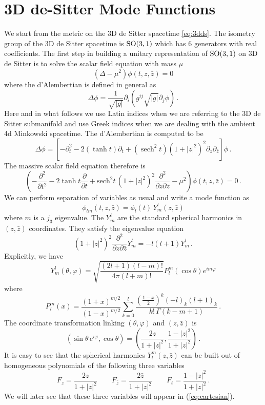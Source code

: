 \documentclass{brownthesis}
\DeclareMathOperator{\sech}{sech}
\begin{document}
\section{3D de-Sitter Mode Functions}

\label{sec:dsmodes}

We start from the metric on the 3D de Sitter spacetime \eqref{eq:3dds}.
The isometry group of the 3D de Sitter spacetime is ${\rm SO(3,1)}$
which has 6 generators with real coefficients. The first step in building
a unitary representation of ${\rm SO(3,1)}$ on 3D de Sitter is to
solve the scalar field equation with mass $\mu$
\[
(\Delta-\mu^{2})\phi(t,z,\bar{z})=0
\]
where the d'Alembertian is defined in general as
\[
\Delta\phi=\frac{1}{\sqrt{|g|}}\partial_{i}(g^{ij}\sqrt{|g|}\partial_{j}\phi)\,.
\]
Here and in what follows we use Latin indices when we are referring
to the 3D de Sitter submanifold and use Greek indices when we are
dealing with the ambient 4d Minkowski spacetime. The d'Alembertian
is computed to be
\[
\Delta\phi=\left[-\partial_{t}^{2}-2(\tanh t)\partial_{t}+(\sech^{2}t)(1+|z|^{2})^{2}\partial_{z}\partial_{\bar{z}}\right]\phi\,.
\]
The massive scalar field equation therefore is
\[
\left(-\frac{\partial^{2}}{\partial t^{2}}-2\tanh t\frac{\partial}{\partial t}+\mathrm{sech}^{2}t\,(1+|z|^{2})^{2}\frac{\partial^{2}}{\partial z\partial\bar{z}}-\mu^{2}\right)\phi(t,z,\bar{z})=0\,.
\]
We can perform separation of variables as usual and write a mode function
as
\[
\phi_{lm}(t,z,\bar{z})=\phi_{l}(t)\,Y_{m}^{l}(z,\bar{z})
\]
where $m$ is a $j_{3}$ eigenvalue. The $Y_{m}^{l}$ are the standard
spherical harmonics \cite{kelvin1867treatise} in $(z,\bar{z})$
coordinates. They satisfy the eigenvalue equation
\[
(1+|z|^{2})^{2}\frac{\partial^{2}}{\partial z\partial\bar{z}}Y_{m}^{l}=-l(l+1)Y_{m}^{l}\,.
\]
Explicitly, we have
\[
Y_{m}^{l}(\theta,\varphi)=\sqrt{\frac{(2l+1)(l-m)!}{4\pi(l+m)!}}P_{l}^{m}(\cos\theta)e^{im\varphi}
\]
where
\[
P_{l}^{m}(x)=\frac{(1+x)^{m/2}}{(1-x)^{m/2}}\sum_{k=0}^{l}\frac{\left(\frac{1-x}{2}\right)^{k}(-l)_{k}(l+1)_{k}}{k!\,\Gamma(k-m+1)}\,.
\]
The coordinate transformation linking $(\theta,\varphi)$ and $(z,\bar{z})$
is
\[
(\sin\theta\,e^{i\varphi},\cos\theta)=\left(\frac{2z}{1+|z|^{2}},\frac{1-|z|^{2}}{1+|z|^{2}}\right)\,.
\]
It is easy to see that the spherical harmonics $Y_{l}^{m}(z,\bar{z})$
can be built out of homogeneous polynomials of the following three
variables
\[
F_{z}=\frac{2z}{1+|z|^{2}}\qquad F_{\bar{z}}=\frac{2\bar{z}}{1+|z|^{2}}\qquad F_{t}=\frac{1-|z|^{2}}{1+|z|^{2}}\,.
\]
We will later see that these three variables will appear in (\ref{eq:cartesian}).
\end{document}
